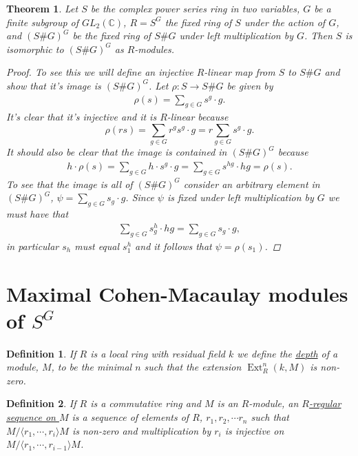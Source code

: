 \documentclass[11pt, a4paper, english]{article}
\numberwithin{prop}{section}
\numberwithin{lemma}{section}
\newtheorem{theorem}{Theorem}
\numberwithin{theorem}{section}
\newtheorem{defin}{Definition}
\numberwithin{defin}{section}
\numberwithin{example}{section}
\newcommand{\C}{\mathbb{C}}
\DeclareMathOperator{\Ext}{Ext}
\begin{document}
\begin{theorem}
Let $S$ be the complex power series ring in two variables, $G$ be a finite subgroup of $GL_2(\C)$, $R = S^G$ the fixed ring of $S$ under the action of $G$, and $(S\#G)^G$ be the fixed ring of $S\#G$ under left multiplication by $G$. Then $S$ is isomorphic to $(S\#G)^G$ as $R$-modules.

\begin{proof}
To see this we will define an injective $R$-linear map from $S$ to $S\#G$ and show that it's image is $(S\#G)^G$. Let $\rho: S \to S\#G$ be given by
\begin{align*}
\rho(s) = \sum_{g \in G} s^g \cdot g.
\end{align*}
It's clear that it's injective and it is $R$-linear because $$\rho(rs) = \sum_{g \in G} r^gs^g \cdot g = r\sum_{g \in G} s^g \cdot g.$$ It should also be clear that the image is contained in $(S\#G)^G$ because
\begin{align*}
h \cdot \rho(s) = \sum_{g \in G} h \cdot s^g \cdot g = \sum_{g \in G} s^{hg} \cdot hg = \rho(s).
\end{align*}
To see that the image is all of $(S\#G)^G$ consider an arbitrary element in $(S\#G)^G$, $\psi = \sum_{g\in G} s_g \cdot g$. Since $\psi$ is fixed under left multiplication by $G$ we must have that
\begin{align*}
\sum_{g\in G} s_g^h \cdot hg = \sum_{g\in G} s_g \cdot g,
\end{align*}
in particular $s_h$ must equal $s_1^h$ and it follows that $\psi = \rho(s_1)$.
\end{proof}
\end{theorem}

\section{Maximal Cohen-Macaulay modules of $S^G$}
\begin{defin}
If $R$ is a local ring with residual field $k$ we define the \underline{depth} of a module, $M$, to be the minimal $n$ such that the extension $\Ext^n_R(k, M)$ is non-zero.
\end{defin}

\begin{defin}
\label{def:regular_seq}
If $R$ is a commutative ring and $M$ is an $R$-module, an \underline{$R$-regular sequence on $M$} is a sequence of elements of $R$, $r_1, r_2, \cdots r_n$ such that $M/\langle r_1, \cdots, r_i \rangle M$ is non-zero and multiplication by $r_i$ is injective on $M/\langle r_1, \cdots, r_{i-1} \rangle M$.
\end{defin}
\end{document}
